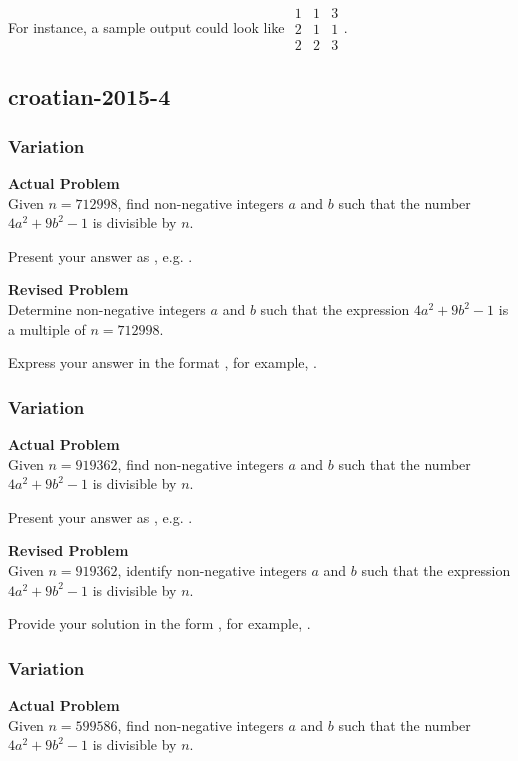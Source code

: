 For instance, a sample output could look like $\boxed{\begin{array}{ccc}1 & 1 & 3 \\ 2 & 1 & 1 \\ 2 & 2 & 3\end{array}}$.

\subsection{croatian-2015-4}
\subsubsection{Variation}
\textbf{Actual Problem}\\
Given $n = 712998$, find non-negative integers $a$ and $b$ such that the number $4a^2 + 9b^2 - 1$ is divisible by $n$.

Present your answer as , e.g. .

\textbf{Revised Problem}\\
Determine non-negative integers \( a \) and \( b \) such that the expression \( 4a^2 + 9b^2 - 1 \) is a multiple of \( n = 712998 \).

Express your answer in the format , for example, .

\subsubsection{Variation}
\textbf{Actual Problem}\\
Given $n = 919362$, find non-negative integers $a$ and $b$ such that the number $4a^2 + 9b^2 - 1$ is divisible by $n$.

Present your answer as , e.g. .

\textbf{Revised Problem}\\
Given \( n = 919362 \), identify non-negative integers \( a \) and \( b \) such that the expression \( 4a^2 + 9b^2 - 1 \) is divisible by \( n \).

Provide your solution in the form , for example, .

\subsubsection{Variation}
\textbf{Actual Problem}\\
Given $n = 599586$, find non-negative integers $a$ and $b$ such that the number $4a^2 + 9b^2 - 1$ is divisible by $n$.

